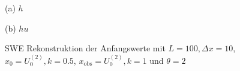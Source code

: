 \begin{figure}[H]
\begin{minipage}[b]{0.49\linewidth}
\centering

\caption*{(a) $h$}
\end{minipage}
\begin{minipage}[b]{0.49\linewidth}
\centering

\caption*{(b) $hu$}
\end{minipage}
\caption{SWE Rekonstruktion der Anfangswerte mit $L=100,\Delta x=10$, $x_0=U_0^{(2)},k=0.5$, $x_{\text{obs}} = U_0^{(2)}, k=1$ und $\theta=2$}
\label{fig:sweOptInitValues}
\end{figure}

